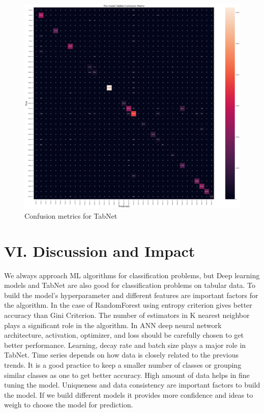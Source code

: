 \documentclass[11 pt,conference,final,]{IEEEtran}
\begin{document}
\begin{figure}

{\centering \includegraphics[width=0.8\linewidth]{img/TabNet} 

}

\caption{Confusion metrics for TabNet}\label{fig:unnamed-chunk-15}
\end{figure}

\section{VI. Discussion and Impact}\label{vi.-discussion-and-impact}

We always approach ML algorithms for classification problems, but Deep
learning models and TabNet are also good for classification problems on
tabular data. To build the model's hyperparameter and different features
are important factors for the algorithm. In the case of RandomForest
using entropy criterion gives better accuracy than Gini Criterion. The
number of estimators in K nearest neighbor plays a significant role in
the algorithm. In ANN deep neural network architecture, activation,
optimizer, and loss should be carefully chosen to get better
performance. Learning, decay rate and batch size plays a major role in
TabNet. Time series depends on how data is closely related to the
previous trends. It is a good practice to keep a smaller number of
classes or grouping similar classes as one to get better accuracy. High
amount of data helps in fine tuning the model. Uniqueness and data
consistency are important factors to build the model. If we build
different models it provides more confidence and ideas to weigh to
choose the model for prediction.
\end{document}
